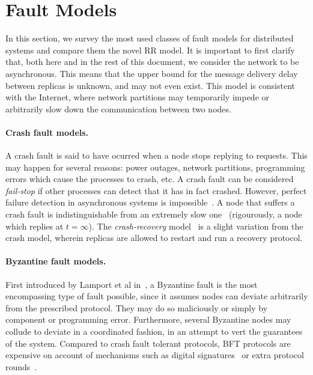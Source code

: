\label{chap:related}
\cleardoublepage{}

\section{Fault Models}\label{sec:related_fault_models}

In this section, we survey the most used classes of fault models
for distributed systems and compare them the novel
\ac{RR} model. It is important to first clarify that, both
here and in the rest of this document, we consider the network to
be asynchronous. This means that the upper bound for the message
delivery delay between replicas is unknown, and may not even
exist. This model is consistent with the Internet, where network
partitions may temporarily impede or arbitrarily slow down the
communication between two nodes.

\paragraph{Crash fault models.} A crash fault is said to have
ocurred when a node stops replying to requests. This may happen
for several reasons: power outages, network
partitions, programming errors which
cause the processes to crash, etc. A crash fault can be
considered \emph{fail-stop} if other processes can detect that it
has in fact crashed. However, perfect failure detection in asynchronous
systems is impossible~\cite{perfect-failure-impossible}. A node that
suffers a crash fault is indistinguishable from an extremely slow
one~\cite{polynomial-communication} (rigourously, a node which replies at $t = \infty$).  The
\emph{crash-recovery}
model~\cite{consensus-recovery,crash-recovery} is a slight variation from the crash
model, wherein replicas are allowed to restart and run a recovery
protocol.

\paragraph{Byzantine fault models.}
First introduced by Lamport et al in~\cite{lamport:byzgenerals},
a Byzantine fault is the most encompassing type of fault
possible, since it assumes nodes can deviate arbitrarily from the
prescribed protocol. They may do so maliciously or simply by component
or programming error. Furthermore, several Byzantine nodes may
collude to deviate in a coordinated fashion, in an attempt to
vert the guarantees of the system. Compared to crash fault
tolerant protocols, \ac{BFT} protocols are expensive on account of
mechanisms such as digital signatures~\cite{bqs} or extra protocol
rounds~\cite{pbft}.


